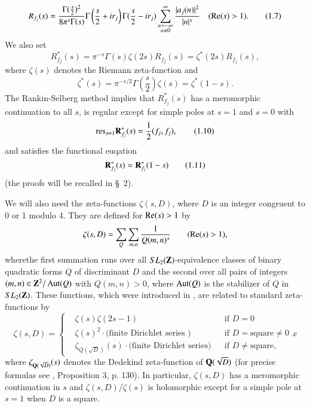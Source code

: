 \begin{equation*}
R_{f_j} (s) = \frac{\Gamma (\frac{s}{2})^2}{8 \pi^s \Gamma (s)} \Gamma \left(\frac{s}{2} + ir_j \right) \Gamma (\frac{s}{2} - ir_j ) \sum\limits^\infty_{\substack{n = -\infty\\ n \neq 0}} \frac{|a_j (n)|^2}{|n|^s} \quad (\operatorname{Re}(s) > 1).
\tag{1.7}\label{art11-eq1.7}
\end{equation*}
We also set 
\begin{equation*}
R^{\ast}_{f_j}(s) = \pi^{-s} \Gamma (s) \zeta (2s) R_{f_j} (s) = \zeta^\ast (2s) R_{f_j} (s), \tag{1.8}\label{art11-eq1.8}
\end{equation*}
where $\zeta(s)$ denotes the Riemann zeta-function and 
\begin{equation*}
\zeta^\ast (s) = \pi^{-s/2} \Gamma \left(\frac{s}{2} \right) \zeta(s) = \zeta^\ast (1-s). \tag{1.9}\label{art11-eq1.9}
\end{equation*}
The Rankin-Selberg method implies that $R^\ast_{f_j}(s)$ has a meromorphic continuation to all $s$, is regular except for simple poles at $s =1$ and $s =0$ with 
\begin{equation*}
\mathrm{res}_{s=1}  \mathbf{R}^\ast_{f_j} (s) = \frac{1}{2} (f_j, f_j), \tag{1.10}\label{art11-eq1.10}
\end{equation*}
and satisfies the functional euqation
\begin{equation*}
\mathbf{R}^\ast_{f_j} (s) = \mathbf{R}^\ast_{f_j} (1-s) \tag{1.11}\label{art11-eq1.11}
\end{equation*}
(the proofs will be recalled in \S~2).

We will also need the zeta-functions $\zeta(s,D)$, where $D$ is an integer congruent to 0 or 1 modulo 4. They are defined for $\operatorname{Re} (s) >1$ by
\begin{equation*}
\zeta(s, D) = \sum\limits_{Q} \sum\limits_{m,n} \frac{1}{Q(m,n)^s} \qquad (\operatorname{Re} (s) >1), \label{art11-eq1.12}
\end{equation*}
where\pageoriginale the first summation runs over all $SL_2 (\mathbf{Z})$-equivalence classes of binary quadratic forms $Q$ of discriminant $D$ and the second over all pairs of integers $(m,n) \in \mathbf{Z}^2 / \operatorname{Aut} (Q)$ with $Q(m,n) >0$, where $\operatorname{Aut} (Q)$ is the stabilizer of $Q$ in $SL_2 (\mathbf{Z})$. These functions, which were introduced in \cite{art11-10}, are related to standard zeta-functions by 
\begin{equation*}
\zeta (s,D) = 
\left\{ 
\begin{aligned}
&\zeta(s) \zeta(2s -1) & & \text{if  }D = 0\\
& \zeta(s)^2  \cdot \text{(finite Dirichlet series )}&&\text{if } D = \text{square} \neq 0\\
& \zeta_{Q (\sqrt{D})} (s) \cdot \text{(finite Dirichlet series)}& & \text{if } D \neq \text{square,}
\end{aligned}
\right.
x\tag{1.13}\label{art11-eq1.13}
\end{equation*}
where $\zeta_{\mathbf{Q}(\sqrt{D})} (s)$  denotes the Dedekind zeta-function of $\mathbf{Q} (\sqrt{D})$ (for precise formulas see \cite{art11-10}, Proposition 3, p. 130). In particular, $\zeta(s,D)$ has a meromorphic continuation in $s$ and $\zeta(s,D)/ \zeta(s)$ is holomorphic except for a simple pole at $s =1$ when $D$ is a square. 

